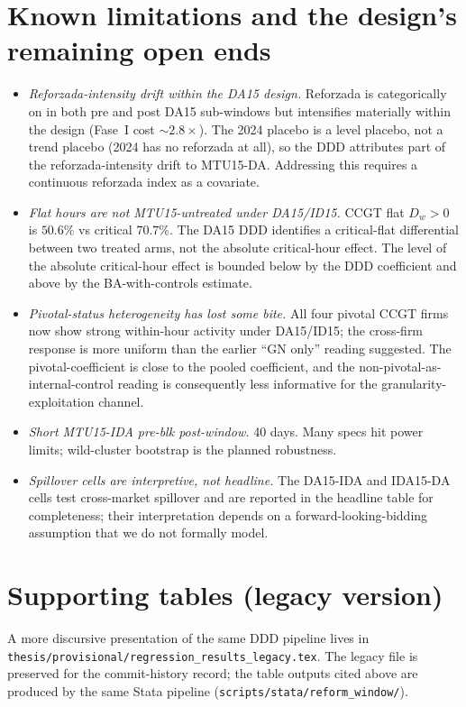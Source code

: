\documentclass[11pt,a4paper]{article}
\newcommand{\code}[1]{\nolinkurl{#1}}
\begin{document}
\section{Known limitations and the design's remaining open ends}\label{sec:ident:open_ends}

\begin{itemize}
\item \emph{Reforzada-intensity drift within the DA15 design.} Reforzada is categorically on in both pre and post DA15 sub-windows but intensifies materially within the design (Fase~I cost $\sim 2.8\times$). The 2024 placebo is a level placebo, not a trend placebo (2024 has no reforzada at all), so the DDD attributes part of the reforzada-intensity drift to MTU15-DA. Addressing this requires a continuous reforzada index as a covariate.
\item \emph{Flat hours are not MTU15-untreated under DA15/ID15.} CCGT flat $D_w > 0$ is $50.6\%$ vs critical $70.7\%$. The DA15 DDD identifies a critical-flat differential between two treated arms, not the absolute critical-hour effect. The level of the absolute critical-hour effect is bounded below by the DDD coefficient and above by the BA-with-controls estimate.
\item \emph{Pivotal-status heterogeneity has lost some bite.} All four pivotal CCGT firms now show strong within-hour activity under DA15/ID15; the cross-firm response is more uniform than the earlier ``GN only'' reading suggested. The pivotal-coefficient is close to the pooled coefficient, and the non-pivotal-as-internal-control reading is consequently less informative for the granularity-exploitation channel.
\item \emph{Short MTU15-IDA pre-blk post-window.} 40 days. Many specs hit power limits; wild-cluster bootstrap is the planned robustness.
\item \emph{Spillover cells are interpretive, not headline.} The DA15-IDA and IDA15-DA cells test cross-market spillover and are reported in the headline table for completeness; their interpretation depends on a forward-looking-bidding assumption that we do not formally model.
\end{itemize}

\section{Supporting tables (legacy version)}\label{sec:ident:legacy}

\noindent A more discursive presentation of the same DDD pipeline lives in \code{thesis/provisional/regression_results_legacy.tex}. The legacy file is preserved for the commit-history record; the table outputs cited above are produced by the same Stata pipeline (\code{scripts/stata/reform_window/}).
\end{document}
